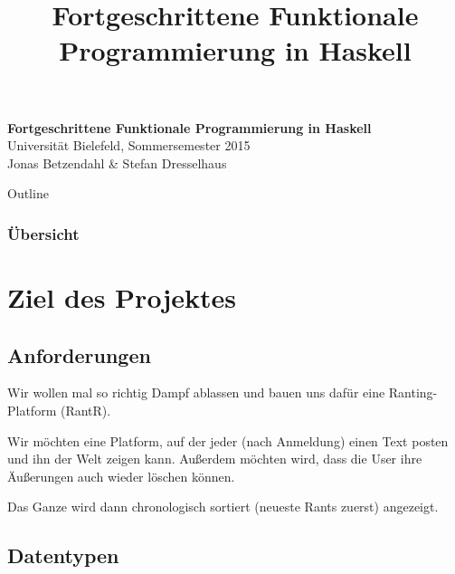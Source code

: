 \documentclass{beamer}
\title{Fortgeschrittene Funktionale Programmierung in Haskell}
\begin{document}
  

  \begin{frame}
  \begin{center}
    \huge\textbf{Fortgeschrittene Funktionale Programmierung in Haskell}\\ \bigskip
    \LARGE Universität Bielefeld, Sommersemester 2015\\ \bigskip
    \large Jonas Betzendahl \& Stefan Dresselhaus
    \end{center}
  \end{frame}

\begin{frame}[allowframebreaks]{Outline}
\frametitle{Übersicht}
\tableofcontents[hideallsubsections]
\end{frame}

\section{Ziel des Projektes}

\subsection{Anforderungen}

\begin{frame}[fragile]

Wir wollen mal so richtig Dampf ablassen und bauen uns dafür eine Ranting-Platform (RantR).
\pause
\bigskip

Wir möchten eine Platform, auf der jeder (nach Anmeldung) einen Text posten und ihn der Welt zeigen kann. Außerdem möchten wird, dass die User ihre Äußerungen auch wieder löschen können.
\bigskip
\pause

Das Ganze wird dann chronologisch sortiert (neueste Rants zuerst) angezeigt.

\end{frame}

\subsection{Datentypen}
\end{document}
